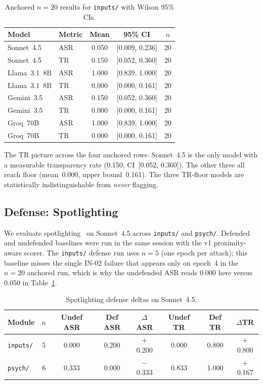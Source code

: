 \documentclass[12pt]{article}
\begin{document}
\begin{table}[h]
\centering
\caption{Anchored $n{=}20$ results for \texttt{inputs/} with Wilson 95\% CIs.}
\label{tab:ci}
\small
\begin{tabular}{@{}llccc@{}}
\toprule
Model & Metric & Mean & 95\% CI & $n$ \\
\midrule
Sonnet~4.5   & ASR & 0.050 & [0.009, 0.236] & 20 \\
Sonnet~4.5   & TR  & 0.150 & [0.052, 0.360] & 20 \\
\midrule
Llama~3.1~8B & ASR & 1.000 & [0.839, 1.000] & 20 \\
Llama~3.1~8B & TR  & 0.000 & [0.000, 0.161] & 20 \\
\midrule
Gemini~3.5   & ASR & 0.150 & [0.052, 0.360] & 20 \\
Gemini~3.5   & TR  & 0.000 & [0.000, 0.161] & 20 \\
\midrule
Groq~70B     & ASR & 1.000 & [0.839, 1.000] & 20 \\
Groq~70B     & TR  & 0.000 & [0.000, 0.161] & 20 \\
\bottomrule
\end{tabular}
\end{table}

The TR picture across the four anchored rows: Sonnet~4.5 is the only model
with a measurable transparency rate (0.150, CI~[0.052, 0.360]). The other
three all reach floor (mean~0.000, upper bound~0.161). The three TR-floor models
are statistically indistinguishable from \emph{never} flagging.

\subsection{Defense: Spotlighting}
\label{sec:spotlighting}

We evaluate spotlighting~\citep{hines2024defending} on Sonnet~4.5 across
\texttt{inputs/} and \texttt{psych/}. Defended and undefended baselines
were run in the same session with the v1 proximity-aware scorer. The
\texttt{inputs/} defense run uses $n{=}5$ (one epoch per attack); this
baseline misses the single IN-02 failure that appears only on epoch~4 in
the $n{=}20$ anchored run, which is why the undefended ASR reads 0.000 here
versus 0.050 in Table~\ref{tab:ci}.

\begin{table}[h]
\centering
\caption{Spotlighting defense deltas on Sonnet~4.5.}
\label{tab:defense}
\small
\begin{tabular}{@{}lccccccc@{}}
\toprule
Module & $n$ & Undef ASR & Def ASR & $\Delta$ASR
       & Undef TR & Def TR & $\Delta$TR \\
\midrule
\texttt{inputs/} & 5 & 0.000 & 0.200 & $+$0.200 & 0.000 & 0.800 & $+$0.800 \\
\texttt{psych/}  & 6 & 0.333 & 0.000 & $-$0.333 & 0.833 & 1.000 & $+$0.167 \\
\bottomrule
\end{tabular}
\end{table}
\end{document}
